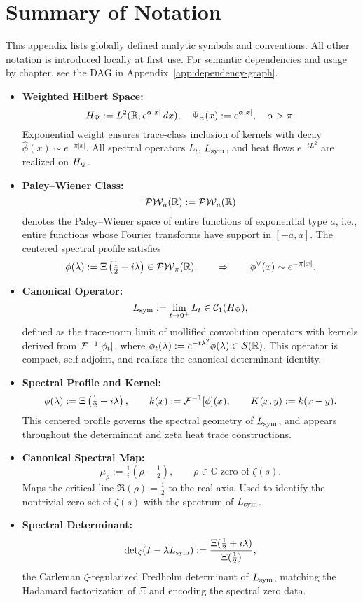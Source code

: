 \section{Summary of Notation}
\label{app:notation_summary}

\noindent
This appendix lists globally defined analytic symbols and conventions. All other notation is introduced locally at first use. For semantic dependencies and usage by chapter, see the DAG in Appendix~\ref{app:dependency-graph}.

\begin{itemize}
  \item \textbf{Weighted Hilbert Space:}
  \[
  H_{\Psi} := L^2(\mathbb{R}, e^{\alpha |x|} \, dx), \quad \Psi_\alpha(x) := e^{\alpha |x|}, \quad \alpha > \pi.
  \]
  Exponential weight ensures trace-class inclusion of kernels with decay \( \widehat{\phi}(x) \sim e^{-\pi |x|} \). All spectral operators \( L_t \), \( L_{\mathrm{sym}} \), and heat flows \( e^{-tL^2} \) are realized on \( H_{\Psi} \).

  \item \textbf{Paley–Wiener Class:}
  \[
  \mathcal{PW}_{a}(\mathbb{R}) := \mathcal{PW}_a(\mathbb{R})
  \]
  denotes the Paley–Wiener space of entire functions of exponential type \( a \), i.e., entire functions whose Fourier transforms have support in \( [-a, a] \). The centered spectral profile satisfies
  \[
  \phi(\lambda) := \Xi\left( \tfrac{1}{2} + i\lambda \right) \in \mathcal{PW}_{\pi}(\mathbb{R}), \qquad \Rightarrow \qquad \phi^\vee(x) \sim e^{-\pi |x|}.
  \]

  \item \textbf{Canonical Operator:}
  \[
  L_{\mathrm{sym}} := \lim_{t \to 0^+} L_t \in \mathcal{C}_1(H_{\Psi}),
  \]
  defined as the trace-norm limit of mollified convolution operators with kernels derived from \( \mathcal{F}^{-1}[\phi_t] \), where \( \phi_t(\lambda) := e^{-t\lambda^2} \phi(\lambda) \in \mathcal{S}(\mathbb{R}) \). This operator is compact, self-adjoint, and realizes the canonical determinant identity.

  \item \textbf{Spectral Profile and Kernel:}
  \[
  \phi(\lambda) := \Xi\left(\tfrac{1}{2} + i\lambda\right), \qquad k(x) := \mathcal{F}^{-1}[\phi](x), \qquad K(x,y) := k(x - y).
  \]
  This centered profile governs the spectral geometry of \( L_{\mathrm{sym}} \), and appears throughout the determinant and zeta heat trace constructions.

  \item \textbf{Canonical Spectral Map:}
  \[
  \mu_\rho := \tfrac{1}{i}(\rho - \tfrac{1}{2}), \qquad \rho \in \mathbb{C} \text{ zero of } \zeta(s).
  \]
  Maps the critical line \( \Re(\rho) = \tfrac{1}{2} \) to the real axis. Used to identify the nontrivial zero set of \( \zeta(s) \) with the spectrum of \( L_{\mathrm{sym}} \).

  \item \textbf{Spectral Determinant:}
  \[
  \det\nolimits_\zeta(I - \lambda L_{\mathrm{sym}}) := \frac{\Xi(\tfrac{1}{2} + i\lambda)}{\Xi(\tfrac{1}{2})},
  \]
  the Carleman \(\zeta\)-regularized Fredholm determinant of \( L_{\mathrm{sym}} \), matching the Hadamard factorization of \( \Xi \) and encoding the spectral zero data.
\end{itemize}

